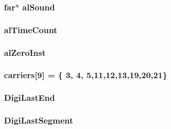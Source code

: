 \label{ID__SD_8C_a4a1e51753cfe2aea51d99cffbcd8eb80}
\hypertarget{ID__SD_8C_abb64954289074edec51f58bb5a122760}{
\subsubsection[{alSound}]{ far$\ast$ {\bf alSound}}}
\label{ID__SD_8C_abb64954289074edec51f58bb5a122760}
\hypertarget{ID__SD_8C_a4d4a035e1ebf79e5bac7b8d0bdef1a98}{
\subsubsection[{alTimeCount}]{ {\bf alTimeCount}}}
\label{ID__SD_8C_a4d4a035e1ebf79e5bac7b8d0bdef1a98}
\hypertarget{ID__SD_8C_a5f76467e381fc23aed5465e3d65e8a91}{
\subsubsection[{alZeroInst}]{ {\bf alZeroInst}}}
\label{ID__SD_8C_a5f76467e381fc23aed5465e3d65e8a91}
\hypertarget{ID__SD_8C_a63f30f1ee0d7dfe2b7b22427ed4592ac}{
\subsubsection[{carriers}]{ {\bf carriers}\mbox{[}9\mbox{]} = \{ 3, 4, 5,11,12,13,19,20,21\}}}
\label{ID__SD_8C_a63f30f1ee0d7dfe2b7b22427ed4592ac}
\hypertarget{ID__SD_8C_a8e9a757998c8a7fabc44ef7bb4df0c5e}{
\subsubsection[{DigiLastEnd}]{ {\bf DigiLastEnd}}}
\label{ID__SD_8C_a8e9a757998c8a7fabc44ef7bb4df0c5e}
\hypertarget{ID__SD_8C_a175fff911b205d6eab165b4d663d18ae}{
\subsubsection[{DigiLastSegment}]{ {\bf DigiLastSegment}}}
